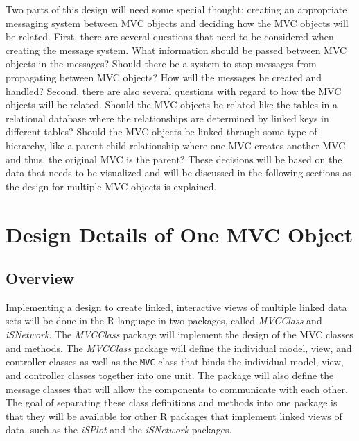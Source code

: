 \documentclass{article}[11pt]
\newcommand{\Robject}[1]{{\texttt{#1}}}
\newcommand{\Rpackage}[1]{{\textit{#1}}}
\begin{document}
Two parts of this design will need some special thought: creating an
appropriate messaging system between MVC objects and deciding how the MVC
objects will be related.  First, there are several questions that need to be
considered when creating the message system.  What information should be
passed between MVC objects in the messages?  Should there be a system to stop
messages from propagating between MVC objects?  How will the messages be
created and handled?  Second, there are also several questions with regard to
how the MVC objects will be related.  Should the MVC objects be related like
the tables in a relational database where the relationships are determined by
linked keys in different tables?  Should the MVC objects be linked through some
type of hierarchy, like a parent-child relationship where one MVC creates
another MVC and thus, the original MVC is the parent?  These decisions will be
based on the data that needs to be visualized and will be discussed in the
following sections as the design for multiple MVC objects is explained.

\section{Design Details of One MVC Object}\label{Sec:OneMVC}

\subsection{Overview}\label{SSec:OneOver}

Implementing a design to create linked, interactive views of multiple linked
data sets will be done in the R language in two packages, called
\Rpackage{MVCClass} and \Rpackage{iSNetwork}.  The \Rpackage{MVCClass} package
will implement the design of the MVC classes and methods.  The
\Rpackage{MVCClass} package will define the individual model, view, and
controller classes as well as the \Robject{MVC} class that binds the
individual model, view, and controller classes together into one unit.  The
package will also define the message classes that will allow the components to
communicate with each other.  The goal of separating these class definitions
and methods into one package is that they will be available for other R
packages that implement linked views of data, such as the \Rpackage{iSPlot}
and the \Rpackage{iSNetwork} packages.  
\end{document}
